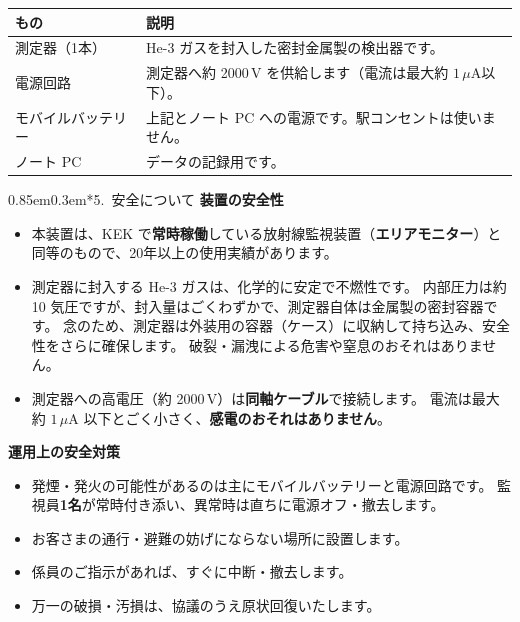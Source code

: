 \documentclass[a4paper,10pt]{ltjsarticle}
\makeatletter
\renewcommand{\section}{\@startsection{section}{1}{\z@}%
  {0.85em}{0.3em}{\normalfont\bfseries\large}}
\makeatother
\begin{document}
\begin{center}
\renewcommand{\arraystretch}{1.08}
\begin{tabularx}{\linewidth}{@{}p{3.2cm} X@{}}
\toprule
\textbf{もの} & \textbf{説明} \\
\midrule
測定器（1本） & He-3 ガスを封入した密封金属製の検出器です。 \\
電源回路 & 測定器へ約 2000\,V を供給します（電流は最大約 $1\,\mu\mathrm{A}$以下）。 \\
モバイルバッテリー & 上記とノート PC への電源です。駅コンセントは使いません。 \\
ノート PC & データの記録用です。 \\
\bottomrule
\end{tabularx}
\end{center}

\section*{5.\ 安全について}
\noindent\textbf{装置の安全性}
\begin{itemize}
  \item 本装置は、KEK で\textbf{常時稼働}している放射線監視装置（\textbf{エリアモニター}）と同等のもので、20年以上の使用実績があります。
  \item 測定器に封入する He-3 ガスは、化学的に安定で不燃性です。
        内部圧力は約 10 気圧ですが、封入量はごくわずかで、測定器自体は金属製の密封容器です。
        念のため、測定器は外装用の容器（ケース）に収納して持ち込み、安全性をさらに確保します。
        破裂・漏洩による危害や窒息のおそれはありません。
  \item 測定器への高電圧（約 2000\,V）は\textbf{同軸ケーブル}で接続します。
        電流は最大約 $1\,\mu\mathrm{A}$ 以下とごく小さく、\textbf{感電のおそれはありません}。
\end{itemize}

\noindent\textbf{運用上の安全対策}
\begin{itemize}
  \item 発煙・発火の可能性があるのは主にモバイルバッテリーと電源回路です。
        監視員\textbf{1名}が常時付き添い、異常時は直ちに電源オフ・撤去します。
  \item お客さまの通行・避難の妨げにならない場所に設置します。
  \item 係員のご指示があれば、すぐに中断・撤去します。
  \item 万一の破損・汚損は、協議のうえ原状回復いたします。
\end{itemize}
\end{document}
